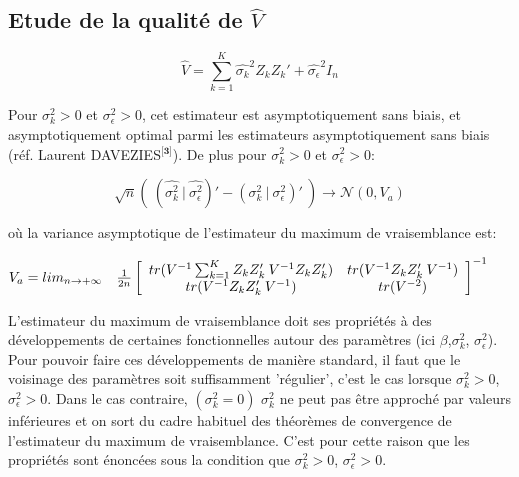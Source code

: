 \documentclass[11pt,fleqn]{book} %
\begin{document}
\subsection{Etude de la qualité de $\hat{V}$}


\vspace{1em}

\[
\hat{V}=\sum_{k=1}^{K} \hat{\sigma_k}^2 Z_k Z_k' + \hat{\sigma_{\epsilon}}^2 I_n
\]

Pour $\sigma_k^2>0$ et $\sigma_{\epsilon}^2>0$, cet estimateur est asymptotiquement sans biais, et asymptotiquement optimal parmi les estimateurs asymptotiquement sans biais (réf. Laurent DAVEZIES$^\textbf{[3]}$). De plus pour $\sigma_k^2>0$ et $\sigma_{\epsilon}^2>0$:


\[ 
\sqrt{n}\left(\:(\hat{\sigma_k^2}\:|\:\hat{\sigma_{\epsilon}^2})'-(\sigma_k^2\:|\:\sigma_{\epsilon}^2)' \:\right) \rightarrow \mathcal{N}(0,V_a)
\]

où la variance asymptotique de l'estimateur du maximum de vraisemblance est:

\vspace{1em}

$V_a =lim_{n\rightarrow +\infty}\quad\frac{1}{2n}\left[
  \begin{array}{ c c }
    tr(V^{-1} \sum_{k=1}^{K} Z_k Z_k'\:V^{-1} Z_k Z_k') & tr(V^{-1} Z_k Z_k'\:V^{-1}) \\
    tr(V^{-1} Z_k Z_k'\:V^{-1}) & tr(V^{-2})  
  \end{array} \right]^{-1}$ 
  \vspace{2em}
  
  \begin{remark}
  L’estimateur du maximum de vraisemblance doit ses propriétés à des développements
de certaines fonctionnelles autour des paramètres (ici $\beta$,$\sigma_k^2$, $\sigma_{\epsilon}^2$). Pour pouvoir faire ces développements de manière standard, il faut que le voisinage des paramètres soit suffisamment
'régulier', c’est le cas lorsque $\sigma_k^2>0$, $\sigma_{\epsilon}^2>0$. Dans le cas contraire, $(\sigma_k^2=0)$  $\sigma_k^2$ ne peut pas
être approché par valeurs inférieures et on sort du cadre habituel des théorèmes de convergence de
l’estimateur du maximum de vraisemblance. C’est pour cette raison que les propriétés sont énoncées
sous la condition que $\sigma_k^2>0$, $\sigma_{\epsilon}^2>0$.
  \end{remark}
  
  
  

\newpage
\end{document}

